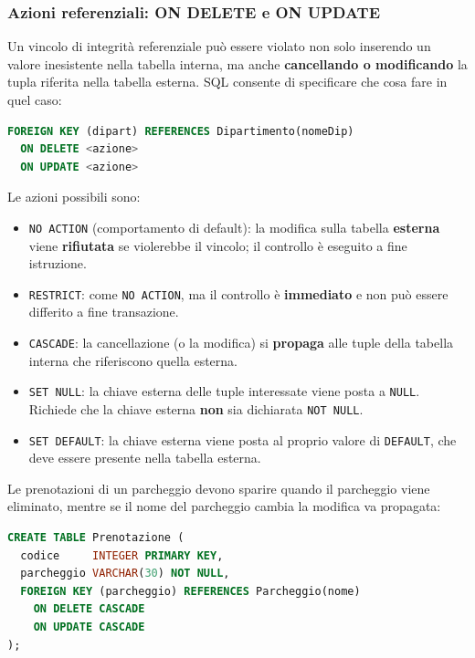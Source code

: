 \documentclass[a4paper,twoside]{article}
\begin{document}
\subsubsection{Azioni referenziali: ON DELETE e ON UPDATE}
Un vincolo di integrità referenziale può essere violato non solo inserendo un valore
inesistente nella tabella interna, ma anche \textbf{cancellando o modificando} la tupla
riferita nella tabella esterna. SQL consente di specificare che cosa fare in quel caso:
\begin{lstlisting}[language=SQL, numbers=none]
FOREIGN KEY (dipart) REFERENCES Dipartimento(nomeDip)
  ON DELETE <azione>
  ON UPDATE <azione>
\end{lstlisting}
Le azioni possibili sono:
\begin{itemize}
  \item \texttt{NO ACTION} (comportamento di default): la modifica sulla tabella
    \textbf{esterna} viene \textbf{rifiutata} se violerebbe il vincolo; il controllo è
    eseguito a fine istruzione.

  \item \texttt{RESTRICT}: come \texttt{NO ACTION}, ma il controllo è
    \textbf{immediato} e non può essere differito a fine transazione.

  \item \texttt{CASCADE}: la cancellazione (o la modifica) si \textbf{propaga} alle
    tuple della tabella interna che riferiscono quella esterna.

  \item \texttt{SET NULL}: la chiave esterna delle tuple interessate viene posta a
    \texttt{NULL}. Richiede che la chiave esterna \textbf{non} sia dichiarata
    \texttt{NOT NULL}.

  \item \texttt{SET DEFAULT}: la chiave esterna viene posta al proprio valore di
    \texttt{DEFAULT}, che deve essere presente nella tabella esterna.
\end{itemize}

\begin{example}
  Le prenotazioni di un parcheggio devono sparire quando il parcheggio viene eliminato,
  mentre se il nome del parcheggio cambia la modifica va propagata:
\begin{lstlisting}[language=SQL]
CREATE TABLE Prenotazione (
  codice     INTEGER PRIMARY KEY,
  parcheggio VARCHAR(30) NOT NULL,
  FOREIGN KEY (parcheggio) REFERENCES Parcheggio(nome)
    ON DELETE CASCADE
    ON UPDATE CASCADE
);
\end{lstlisting}
\end{example}
\end{document}
